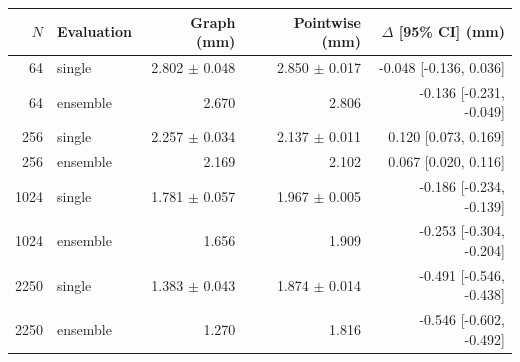 \begin{tabular}{rlrrr}
\hline
$N$ & Evaluation & Graph (mm) & Pointwise (mm) & $\Delta$ [95\% CI] (mm) \\
\hline
64 & single & 2.802 $\pm$ 0.048 & 2.850 $\pm$ 0.017 & -0.048 [-0.136, 0.036] \\
64 & ensemble & 2.670 & 2.806 & -0.136 [-0.231, -0.049] \\
256 & single & 2.257 $\pm$ 0.034 & 2.137 $\pm$ 0.011 & 0.120 [0.073, 0.169] \\
256 & ensemble & 2.169 & 2.102 & 0.067 [0.020, 0.116] \\
1024 & single & 1.781 $\pm$ 0.057 & 1.967 $\pm$ 0.005 & -0.186 [-0.234, -0.139] \\
1024 & ensemble & 1.656 & 1.909 & -0.253 [-0.304, -0.204] \\
2250 & single & 1.383 $\pm$ 0.043 & 1.874 $\pm$ 0.014 & -0.491 [-0.546, -0.438] \\
2250 & ensemble & 1.270 & 1.816 & -0.546 [-0.602, -0.492] \\
\hline
\end{tabular}

